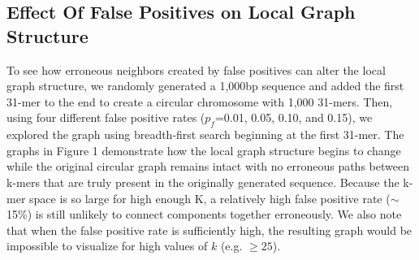 \documentclass[12pt]{article} \usepackage{simplemargins}
\begin{document}
\subsection{Effect Of False Positives on Local Graph Structure}
To see how erroneous neighbors created by false positives can alter 
the local graph structure, we randomly generated a 1,000bp sequence 
and added the first 31-mer to
the end to create a circular chromosome with 1,000 31-mers. Then,
using four different false positive rates ($p_f$=0.01, 0.05, 0.10, and
0.15), we explored the graph using breadth-first search beginning at
the first 31-mer. 
The graphs in Figure 
1 demonstrate how
the local graph structure begins to change while the original circular
graph remains intact with no erroneous paths between k-mers that are
truly present in the originally generated sequence. Because the k-mer
space is so large for high enough K, a relatively high false positive 
rate ($\sim$ 15\%) is still 
unlikely to connect components
together erroneously. We also note that when the false positive
rate is sufficiently high, the resulting graph would be
impossible to visualize for high values of $k$ (e.g. $\ge 25$). 
\end{document}
